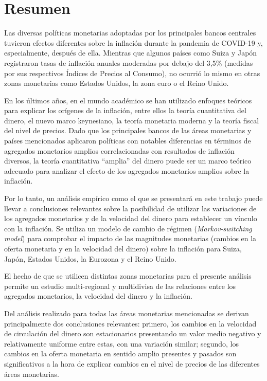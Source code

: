 \section*{Resumen}
Las diversas políticas monetarias adoptadas por los principales bancos centrales tuvieron efectos diferentes sobre la inflación durante la pandemia de COVID-19 y, especialmente, después de ella. Mientras que algunos países como Suiza y Japón registraron tasas de inflación anuales moderadas por debajo del 3,5\% (medidas por sus respectivos Índices de Precios al Consumo), no ocurrió lo mismo en otras zonas monetarias como Estados Unidos, la zona euro o el Reino Unido.

En los últimos años, en el mundo académico se han utilizado enfoques teóricos para explicar los orígenes de la inflación, entre ellos la teoría cuantitativa del dinero, el nuevo marco keynesiano, la teoría monetaria moderna y la teoría fiscal del nivel de precios. Dado que los principales bancos de las áreas monetarias y países mencionados aplicaron políticas con notables diferencias en términos de agregados monetarios amplios correlacionadas con resultados de inflación diversos, la teoría cuantitativa \enquote{amplia} del dinero puede ser un marco teórico adecuado para analizar el efecto de los agregados monetarios amplios sobre la inflación.

Por lo tanto, un análisis empírico como el que se presentará en este trabajo puede llevar a conclusiones relevantes sobre la posibilidad de utilizar las variaciones de los agregados monetarios y de la velocidad del dinero para establecer un vínculo con la inflación. Se utiliza un modelo de cambio de régimen (\textit{Markov-switching model}) para comprobar el impacto de las magnitudes monetarias (cambios en la oferta monetaria y en la velocidad del dinero) sobre la inflación para Suiza, Japón, Estados Unidos, la Eurozona y el Reino Unido.

El hecho de que se utilicen distintas zonas monetarias para el presente análisis permite un estudio multi-regional y multidivisa de las relaciones entre los agregados monetarios, la velocidad del dinero y la inflación.

Del análisis realizado para todas las áreas monetarias mencionadas se derivan principalmente dos conclusiones relevantes: primero, los cambios en la velocidad de circulación del dinero son estacionarios presentando un valor medio negativo y relativamente uniforme entre estas, con una variación similar; segundo, los cambios en la oferta monetaria en sentido amplio presentes y pasados son significativos a la hora de explicar cambios en el nivel de precios de las diferentes áreas monetarias.